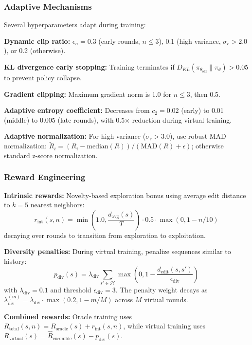 \documentclass[conference]{IEEEtran}
\begin{document}
\subsubsection{Adaptive Mechanisms}

Several hyperparameters adapt during training:

\textbf{Dynamic clip ratio:} $\epsilon_n = 0.3$ (early rounds, $n \leq 3$), 0.1 (high variance, $\sigma_r > 2.0$), or 0.2 (otherwise).

\textbf{KL divergence early stopping:} Training terminates if $D_{KL}(\pi_{\theta_{\text{old}}} \| \pi_{\theta}) > 0.05$ to prevent policy collapse.

\textbf{Gradient clipping:} Maximum gradient norm is 1.0 for $n \leq 3$, then 0.5.

\textbf{Adaptive entropy coefficient:} Decreases from $c_2 = 0.02$ (early) to 0.01 (middle) to 0.005 (late rounds), with 0.5× reduction during virtual training.

\textbf{Adaptive normalization:} For high variance ($\sigma_r > 3.0$), use robust MAD normalization: $\tilde{R}_i = (R_i - \text{median}(R))/(\text{MAD}(R) + \epsilon)$; otherwise standard z-score normalization.

\subsubsection{Reward Engineering}

\textbf{Intrinsic rewards:} Novelty-based exploration bonus using average edit distance to $k=5$ nearest neighbors:
%
\begin{equation}
r_{\text{int}}(s, n) = \min\left(1.0, \frac{d_{\text{avg}}(s)}{T}\right) \cdot 0.5 \cdot \max(0, 1 - n/10)
\end{equation}
%
decaying over rounds to transition from exploration to exploitation.

\textbf{Diversity penalties:} During virtual training, penalize sequences similar to history:
%
\begin{equation}
p_{\text{div}}(s) = \lambda_{\text{div}} \sum_{s' \in \mathcal{H}} \max\left(0, 1 - \frac{d_{\text{edit}}(s, s')}{\epsilon_{\text{div}}}\right)
\end{equation}
%
with $\lambda_{\text{div}} = 0.1$ and threshold $\epsilon_{\text{div}} = 3$. The penalty weight decays as $\lambda_{\text{div}}^{(m)} = \lambda_{\text{div}} \cdot \max(0.2, 1 - m/M)$ across $M$ virtual rounds.

\textbf{Combined rewards:} Oracle training uses $R_{\text{total}}(s, n) = R_{\text{oracle}}(s) + r_{\text{int}}(s, n)$, while virtual training uses $R_{\text{virtual}}(s) = \hat{R}_{\text{ensemble}}(s) - p_{\text{div}}(s)$.
\end{document}

